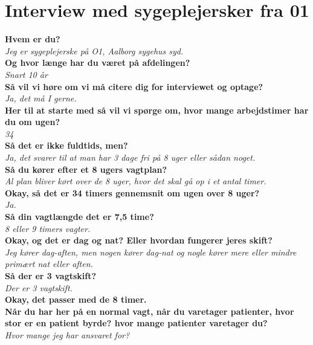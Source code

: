 \section{Interview med sygeplejersker fra 01}
\textbf{Hvem er du?} \\
\noindent
\textit{Jeg er sygeplejerske på O1, Aalborg sygehus syd.} \\
\noindent
\textbf{Og hvor længe har du været på afdelingen?}\\
\noindent
\textit{Snart 10 år} \\
\noindent
\textbf{Så vil vi høre om vi må citere dig for interviewet og optage?}\\
\noindent
\textit{ Ja, det må I gerne.}  \\
\noindent
\textbf{Her til at starte med så vil vi spørge om, hvor mange arbejdstimer har du om ugen?} \\
\noindent
\textit{34} \\
\noindent
\textbf{Så det er ikke fuldtids, men?} \\
\noindent
\textit{Ja, det svarer til at man har 3 dage fri på 8 uger eller sådan noget.} \\
\noindent
\textbf{Så du kører efter et 8 ugers vagtplan?} \\
\noindent
\textit{Al plan bliver kørt over de 8 uger, hvor det skal gå op i et antal timer.} \\
\noindent
\textbf{Okay, så det er 34 timers gennemsnit om ugen over 8 uger?} \\
\noindent
\textit{Ja.} \\
\noindent
\textbf{Så din vagtlængde det er 7,5 time? } \\
\noindent
\textit{8 eller 9 timers vagter.} \\
\noindent
\textbf{Okay, og det er dag og nat? Eller hvordan fungerer jeres skift?} \\
\noindent
\textit{Jeg kører dag-aften, men nogen kører dag-nat og nogle kører mere eller mindre primært nat eller aften.} \\
\noindent
\textbf{Så der er 3 vagtskift?} \\
\noindent
\textit{Der er 3 vagtskift.} \\
\noindent
\textbf{Okay, det passer med de 8 timer.} \\
\noindent
\textbf{Når du har her på en normal vagt, når du varetager patienter, hvor stor er en patient byrde? hvor mange patienter varetager du?} \\
\noindent
\textit{Hvor mange jeg har ansvaret for?} \\
